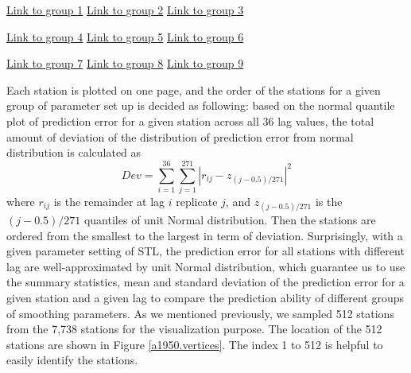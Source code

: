 \begin{framed}
\begin{center}
  \href{../plots/a1950/E1/QQ.error.tmax.group.1.pdf}{Link to group 1} 
  \;\;\;\;\;\;\;\;\;\;
  \href{../plots/a1950/E1/QQ.error.tmax.group.2.pdf}{Link to group 2} 
  \;\;\;\;\;\;\;\;\;\;
  \href{../plots/a1950/E1/QQ.error.tmax.group.3.pdf}{Link to group 3}
\end{center}
\begin{center}
  \href{../plots/a1950/E1/QQ.error.tmax.group.4.pdf}{Link to group 4} 
  \;\;\;\;\;\;\;\;\;\;
  \href{../plots/a1950/E1/QQ.error.tmax.group.5.pdf}{Link to group 5} 
  \;\;\;\;\;\;\;\;\;\;
  \href{../plots/a1950/E1/QQ.error.tmax.group.6.pdf}{Link to group 6}
\end{center}
\begin{center}
  \href{../plots/a1950/E1/QQ.error.tmax.group.7.pdf}{Link to group 7} 
  \;\;\;\;\;\;\;\;\;\;
  \href{../plots/a1950/E1/QQ.error.tmax.group.8.pdf}{Link to group 8} 
  \;\;\;\;\;\;\;\;\;\;
  \href{../plots/a1950/E1/QQ.error.tmax.group.9.pdf}{Link to group 9}
  \label{QQ.error.laggroup.E1}
\end{center}
\end{framed}

Each station is plotted on one page, and the order of the stations for a given 
group of parameter set up is decided as following: 
based on the normal quantile plot of prediction error for a given station across 
all 36 lag values, the total amount of deviation of the distribution of prediction 
error from normal distribution is calculated as
$$
Dev = \sum_{i=1}^{36} \sum_{j=1}^{271} |r_{ij} - z_{(j-0.5)/271}|^2
$$
where $r_{ij}$ is the remainder at lag $i$ replicate $j$, and $z_{(j-0.5)/271}$ 
is the $(j-0.5)/271$ quantiles of unit Normal distribution.
Then the stations are ordered from the smallest to the largest in term of 
deviation. Surprisingly, with a given parameter setting of STL, the
prediction error for all stations with different lag are well-approximated by
unit Normal distribution, which guarantee us to use the summary statistics, mean
and standard deviation of the prediction error for a given station and a given
lag to compare the prediction ability of different groups of smoothing parameters.
As we mentioned previously, we sampled 512 stations from the 7,738 stations for
the visualization purpose. The location of the 512 stations are shown in 
Figure \href{../plots/vertices.a1950.pdf}{\ref*{a1950.vertices}}. The index 1
to 512 is helpful to easily identify the stations. 

